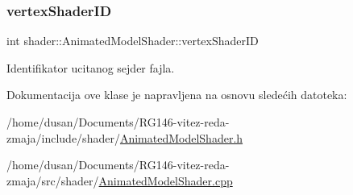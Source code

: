 \subsubsection{\texorpdfstring{vertex\+Shader\+ID}{vertexShaderID}}
{\footnotesize\ttfamily int shader\+::\+Animated\+Model\+Shader\+::vertex\+Shader\+ID\hspace{0.3cm}{\ttfamily [private]}}



Identifikator ucitanog sejder fajla. 



Dokumentacija ove klase je napravljena na osnovu sledećih datoteka\+:\begin{DoxyCompactItemize}
\item 
/home/dusan/\+Documents/\+R\+G146-\/vitez-\/reda-\/zmaja/include/shader/\hyperlink{AnimatedModelShader_8h}{Animated\+Model\+Shader.\+h}\item 
/home/dusan/\+Documents/\+R\+G146-\/vitez-\/reda-\/zmaja/src/shader/\hyperlink{AnimatedModelShader_8cpp}{Animated\+Model\+Shader.\+cpp}\end{DoxyCompactItemize}
